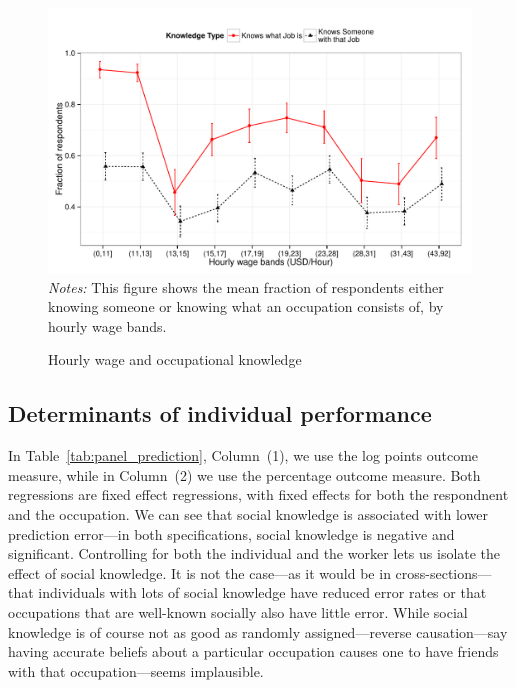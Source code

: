 \documentclass[11pt]{article}
\begin{document}
\begin{figure}
\caption{Hourly wage and occupational knowledge \label{fig:knowledge_by_wage}} 
\centering
\begin{minipage}{0.90 \linewidth}
\includegraphics[width = \linewidth]{./plots/knowledge_by_wage.pdf}
\\
\emph{Notes:} This figure shows the mean fraction of respondents either knowing someone or knowing what an occupation consists of, by hourly wage bands. 
\end{minipage}  
\end{figure} 

\subsection{Determinants of individual performance} 
In Table~\ref{tab:panel_prediction}, Column~(1), we use the log points outcome measure, while in Column~(2) we use the percentage outcome measure. 
Both regressions are fixed effect regressions, with fixed effects for both the respondnent and the occupation.  
We can see that social knowledge is associated with lower prediction error---in both specifications, social knowledge is negative and significant. 
Controlling for both the individual and the worker lets us isolate the effect of social knowledge. 
It is not the case---as it would be in cross-sections---that individuals with lots of social knowledge have reduced error rates or that occupations that are well-known socially also have little error. 
While social knowledge is of course not as good as randomly assigned---reverse causation---say having accurate beliefs about a particular occupation causes one to have friends with that occupation---seems implausible. 
\end{document}
